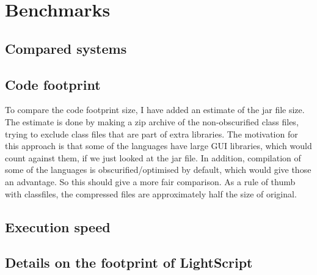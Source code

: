 \chapter{Benchmarks}
\section{Compared systems}
\section{Code footprint}
To compare the code footprint size, I have added an estimate of the jar file size. 
The estimate is done by making a zip archive of the non-obscurified class files,
trying to exclude class files that are part of extra libraries.
The motivation for this approach is that some of the languages have large GUI libraries,
which would count against them, if we just looked at the jar file. 
In addition, compilation of some of the languages is obscurified/optimised by default,
which would give those an advantage. So this should give a more fair comparison.
As a rule of thumb with classfiles, the compressed files are approximately half the size of original.

\section{Execution speed}

\section{Details on the footprint of LightScript}


